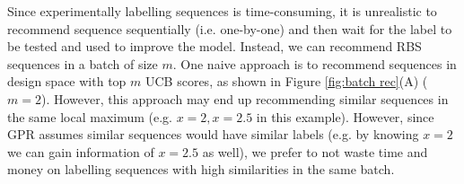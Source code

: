 Since experimentally labelling sequences is time-consuming, it is unrealistic to recommend sequence sequentially (i.e. one-by-one) and then wait for the label to be tested and used to improve the model.
Instead, we can recommend RBS sequences in a batch of size $m$. 
One naive approach is to 
recommend sequences in design space with top $m$ UCB scores, as shown in Figure \ref{fig:batch rec}(A) ($m = 2$).
However, this approach may end up recommending similar sequences in the same local maximum (e.g. $x = 2, x =2.5$ in this example). 
However, since GPR assumes similar sequences would have similar labels (e.g. by knowing $x=2$ we can gain information of $x=2.5$ as well), we prefer to not waste time and money on labelling sequences with high similarities in the same batch.


